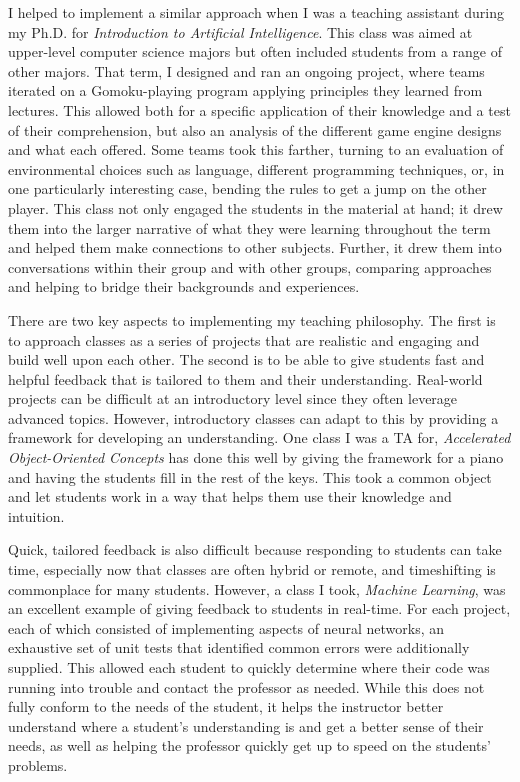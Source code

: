 \documentclass[12pt]{article}
\begin{document}
I helped to implement a similar approach when I was a teaching assistant during my Ph.D. for \emph{Introduction to Artificial Intelligence}.
This class was aimed at upper-level computer science majors but often included students from a range of other majors. 
That term, I designed and ran an ongoing project, where teams iterated on a Gomoku-playing program applying principles they learned from lectures.
This allowed both for a specific application of their knowledge and a test of their comprehension, but also an analysis of the different game engine designs and what each offered.
Some teams took this farther, turning to an evaluation of environmental choices such as language, different programming techniques, or, in one particularly interesting case, bending the rules to get a jump on the other player.
This class not only engaged the students in the material at hand; it drew them into the larger narrative of what they were learning throughout the term and helped them make connections to other subjects.
Further, it drew them into conversations within their group and with other groups, comparing approaches and helping to bridge their backgrounds and experiences.


There are two key aspects to implementing my teaching philosophy.
The first is to approach classes as a series of projects that are realistic and engaging and build well upon each other.
The second is to be able to give students fast and helpful feedback that is tailored to them and their understanding.
Real-world projects can be difficult at an introductory level since they often leverage advanced topics.
However, introductory classes can adapt to this by providing a framework for developing an understanding.
One class I was a TA for, \emph{Accelerated Object-Oriented Concepts} has done this well by giving the framework for a piano and having the students fill in the rest of the keys.
This took a common object and let students work in a way that helps them use their knowledge and intuition. 

Quick, tailored feedback is also difficult because responding to students can take time, especially now that classes are often hybrid or remote, and timeshifting is commonplace for many students.
However, a class I took, \emph{Machine Learning}, was an excellent example of giving feedback to students in real-time.
For each project, each of which consisted of implementing aspects of neural networks, an exhaustive set of unit tests that identified common errors were additionally supplied. 
This allowed each student to quickly determine where their code was running into trouble and contact the professor as needed.
While this does not fully conform to the needs of the student, it helps the instructor better understand where a student's understanding is and get a better sense of their needs, as well as helping the professor quickly get up to speed on the students' problems.
\end{document}
